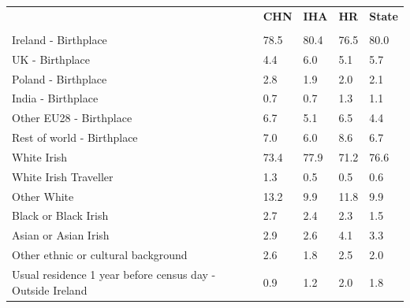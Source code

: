 \documentclass{article}
\begin{document}
\pagebreak
\begin{table}[h]	
\centering
		\begin{tabular}{KTTTT}
  \hline
& \textbf{CHN} & \textbf{IHA} & \textbf{HR}& \textbf{State}\\ 
  \hline
    \\ 
    \hline
Ireland - Birthplace & 78.5& 80.4& 76.5& 80.0\\
UK - Birthplace & 4.4& 6.0& 5.1& 5.7\\
Poland - Birthplace & 2.8& 1.9& 2.0& 2.1\\
India - Birthplace & 0.7& 0.7& 1.3& 1.1\\
Other EU28 - Birthplace & 6.7& 5.1& 6.5& 4.4\\
Rest of world - Birthplace & 7.0& 6.0& 8.6& 6.7\\
    \hline
White Irish & 73.4& 77.9& 71.2& 76.6\\
White Irish Traveller & 1.3& 0.5& 0.5& 0.6\\
Other White & 13.2&  9.9& 11.8&  9.9\\
Black or Black Irish & 2.7& 2.4& 2.3& 1.5\\
Asian or Asian Irish & 2.9& 2.6& 4.1& 3.3\\
Other ethnic or cultural background & 2.6& 1.8& 2.5& 2.0\\
    \hline
Usual residence 1 year before census day - Outside Ireland & 0.9& 1.2& 2.0& 1.8\\


\end{tabular}
\end{table}
\end{document}
